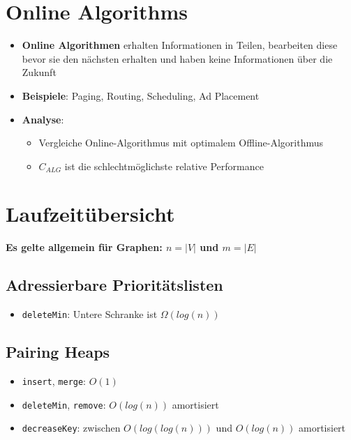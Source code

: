 \documentclass[10pt,a4paper]{article}
\begin{document}
	\section{Online Algorithms}
	\label{oa:sec:online_algorithms}

	\begin{itemize}
		\item \textbf{Online Algorithmen} erhalten Informationen in Teilen, bearbeiten diese bevor sie den nächsten erhalten und haben keine Informationen über die Zukunft
		\item \textbf{Beispiele}: Paging, Routing, Scheduling, Ad Placement
		\item \textbf{Analyse}:
		\begin{itemize}
			\item Vergleiche Online-Algorithmus mit optimalem Offline-Algorithmus
			\item $C_{ALG}$ ist die schlechtmöglichste relative Performance
		\end{itemize}
	\end{itemize}

	\newpage
	\section{Laufzeitübersicht}
	\label{lz:sec:laufzeituebersicht}
	\textbf{Es gelte allgemein für Graphen: $n = |V|$ und $m = |E|$}
	\subsection{Adressierbare Prioritätslisten}
	\label{lz:sub:adressierbare_prioritaetslisten}
	
	\begin{itemize}
		\item \texttt{deleteMin}: Untere Schranke ist $\Omega(log (n))$
	\end{itemize}

	\subsection{Pairing Heaps}
	\label{lz:sub:pairing_heaps}
	
	\begin{itemize}
		\item \texttt{insert}, \texttt{merge}: $O(1)$
		\item \texttt{deleteMin}, \texttt{remove}: $O(log (n))$ amortisiert
		\item \texttt{decreaseKey}: zwischen $O(log (log (n)))$ und $O(log (n))$ amortisiert
	\end{itemize}
	
\end{document}
